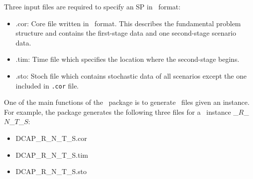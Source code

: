 Three input files are required to specify an SP in \smps\ format:
\begin{itemize}
	\item .cor: Core file written in \mps\ format. This describes the fundamental problem structure and contains the first-stage data and one second-stage scenario data.
	\item .tim: Time file which specifies the location where the second-stage begins.
	\item .sto: Stoch file which contains stochastic data of all scenarios except the one included in \texttt{.cor} file.
\end{itemize}
One of the main functions of the \julia\ package is to generate \smps\ files given an instance. For example, the package generates the following three files for a \dcap\ instance \dcap\_$R$\_$N$\_$T$\_$S$:
\begin{itemize}
	\item DCAP\_R\_N\_T\_S.cor
	\item DCAP\_R\_N\_T\_S.tim
	\item DCAP\_R\_N\_T\_S.sto
\end{itemize}

